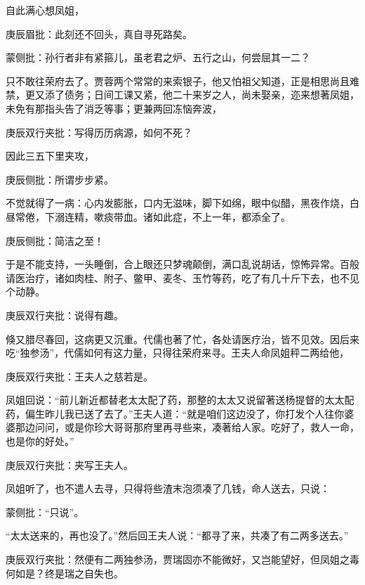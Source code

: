 \begin{parag}
    自此满心想凤姐，\begin{note}庚辰眉批：此刻还不回头，真自寻死路矣。\end{note}\begin{note}蒙侧批：孙行者非有紧箍儿，虽老君之炉、五行之山，何尝屈其一二？\end{note}只不敢往荣府去了。贾蓉两个常常的来索银子，他又怕祖父知道，正是相思尚且难禁，更又添了债务；日间工课又紧，他二十来岁之人，尚未娶亲，迩来想著凤姐，未免有那指头告了消乏等事；更兼两回冻恼奔波，\begin{note}庚辰双行夹批：写得历历病源，如何不死？\end{note}因此三五下里夹攻，\begin{note}庚辰侧批：所谓步步紧。\end{note}不觉就得了一病：心内发膨胀，口内无滋味，脚下如绵，眼中似醋，黑夜作烧，白昼常倦，下溺连精，嗽痰带血。诸如此症，不上一年，都添全了。\begin{note}庚辰侧批：简洁之至！\end{note}于是不能支持，一头睡倒，合上眼还只梦魂颠倒，满口乱说胡话，惊怖异常。百般请医治疗，诸如肉桂、附子、鳖甲、麦冬、玉竹等药，吃了有几十斤下去，也不见个动静。\begin{note}庚辰双行夹批：说得有趣。\end{note}
\end{parag}


\begin{parag}
    倏又腊尽春回，这病更又沉重。代儒也著了忙，各处请医疗治，皆不见效。因后来吃“独参汤”，代儒如何有这力量，只得往荣府来寻。王夫人命凤姐秤二两给他，\begin{note}庚辰双行夹批：王夫人之慈若是。\end{note}凤姐回说：“前儿新近都替老太太配了药，那整的太太又说留著送杨提督的太太配药，偏生昨儿我已送了去了。”王夫人道：“就是咱们这边没了，你打发个人往你婆婆那边问问，或是你珍大哥哥那府里再寻些来，凑著给人家。吃好了，救人一命，也是你的好处。”\begin{note}庚辰双行夹批：夹写王夫人。\end{note}凤姐听了，也不遣人去寻，只得将些渣末泡须凑了几钱，命人送去，只说：\begin{note}蒙侧批：“只说”。\end{note}“太太送来的，再也没了。”然后回王夫人说：“都寻了来，共凑了有二两多送去。”\begin{note}庚辰双行夹批：然便有二两独参汤，贾瑞固亦不能微好，又岂能望好，但凤姐之毒何如是？终是瑞之自失也。\end{note}
\end{parag}


